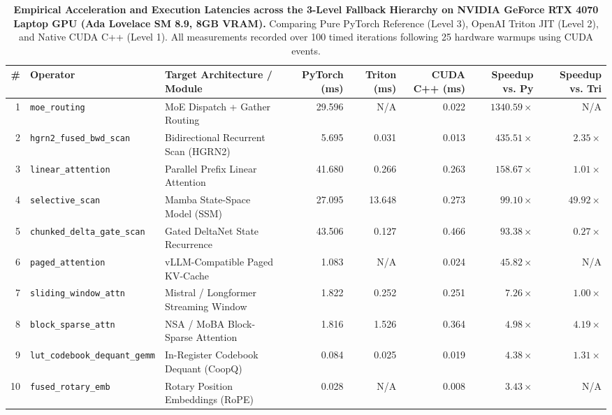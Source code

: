 \begin{table}[t]
\centering
\caption{\textbf{Empirical Acceleration and Execution Latencies across the 3-Level Fallback Hierarchy on NVIDIA GeForce RTX 4070 Laptop GPU (Ada Lovelace SM 8.9, 8GB VRAM).}
Comparing Pure PyTorch Reference (Level 3), OpenAI Triton JIT (Level 2), and Native CUDA C++ (Level 1). All measurements recorded over 100 timed iterations following 25 hardware warmups using CUDA events.}
\label{tab:18_native_cuda_kernels_3level}
\scriptsize
\setlength{\tabcolsep}{3.5pt}
\begin{tabular}{rllrrrrr}
\toprule
\textbf{\#} & \textbf{Operator} & \textbf{Target Architecture / Module} & \textbf{PyTorch (ms)} & \textbf{Triton (ms)} & \textbf{CUDA C++ (ms)} & \textbf{Speedup vs. Py} & \textbf{Speedup vs. Tri} \\
\midrule
1 & \texttt{moe\_routing} & MoE Dispatch + Gather Routing & 29.596 & N/A & 0.022 & $\mathbf{1340.59\times}$ & N/A \\
2 & \texttt{hgrn2\_fused\_bwd\_scan} & Bidirectional Recurrent Scan (HGRN2) & 5.695 & 0.031 & 0.013 & $\mathbf{435.51\times}$ & $\mathbf{2.35\times}$ \\
3 & \texttt{linear\_attention} & Parallel Prefix Linear Attention & 41.680 & 0.266 & 0.263 & $\mathbf{158.67\times}$ & $\mathbf{1.01\times}$ \\
4 & \texttt{selective\_scan} & Mamba State-Space Model (SSM) & 27.095 & 13.648 & 0.273 & $\mathbf{99.10\times}$ & $\mathbf{49.92\times}$ \\
5 & \texttt{chunked\_delta\_gate\_scan} & Gated DeltaNet State Recurrence & 43.506 & 0.127 & 0.466 & $\mathbf{93.38\times}$ & $0.27\times$ \\
6 & \texttt{paged\_attention} & vLLM-Compatible Paged KV-Cache & 1.083 & N/A & 0.024 & $\mathbf{45.82\times}$ & N/A \\
7 & \texttt{sliding\_window\_attn} & Mistral / Longformer Streaming Window & 1.822 & 0.252 & 0.251 & $\mathbf{7.26\times}$ & $1.00\times$ \\
8 & \texttt{block\_sparse\_attn} & NSA / MoBA Block-Sparse Attention & 1.816 & 1.526 & 0.364 & $\mathbf{4.98\times}$ & $\mathbf{4.19\times}$ \\
9 & \texttt{lut\_codebook\_dequant\_gemm} & In-Register Codebook Dequant (CoopQ) & 0.084 & 0.025 & 0.019 & $\mathbf{4.38\times}$ & $\mathbf{1.31\times}$ \\
10 & \texttt{fused\_rotary\_emb} & Rotary Position Embeddings (RoPE) & 0.028 & N/A & 0.008 & $\mathbf{3.43\times}$ & N/A \\

\end{tabular}
\end{table}
